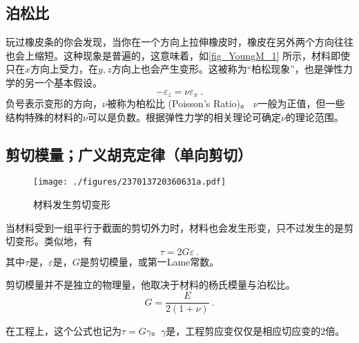 \subsection{泊松比}
玩过橡皮条的你会发现，当你在一个方向上拉伸橡皮时，橡皮在另外两个方向往往也会上缩短。这种现象是普遍的，这意味着，如\autoref{fig_YoungM_1} 所示，材料即使只在$x$方向上受力，在$y,z$方向上也会产生变形。这被称为“柏松现象”，也是弹性力学的另一个基本假设。
\begin{equation}
-\varepsilon_z= \nu \varepsilon_x~.
\end{equation}
负号表示变形的方向，$\nu$被称为柏松比 (Poisson's Ratio)。 $\nu$一般为正值，但一些结构特殊的材料的$\nu$可以是负数。根据弹性力学的相关理论可确定$\nu$的理论范围。%

\subsection{剪切模量；广义胡克定律（单向剪切）}
\begin{figure}[ht]
\centering
\texttt{[image: ./figures/237013720360631a.pdf]}
\caption{材料发生剪切变形} \label{fig_YoungM_2}
\end{figure}
当材料受到一组平行于截面的剪切外力时，材料也会发生形变，只不过发生的是剪切变形。类似地，有
\begin{equation}
\tau=2G\varepsilon~.
\end{equation}
其中$\tau$是，$\varepsilon$是，$G$是剪切模量，或第一Lame常数。

剪切模量并不是独立的物理量，他取决于材料的杨氏模量与泊松比。
\begin{equation}
G = \frac{E}{2(1+\nu)}~.
\end{equation}

在工程上，这个公式也记为$\tau=G\gamma$。$\gamma$是，工程剪应变仅仅是相应切应变的$2$倍。
